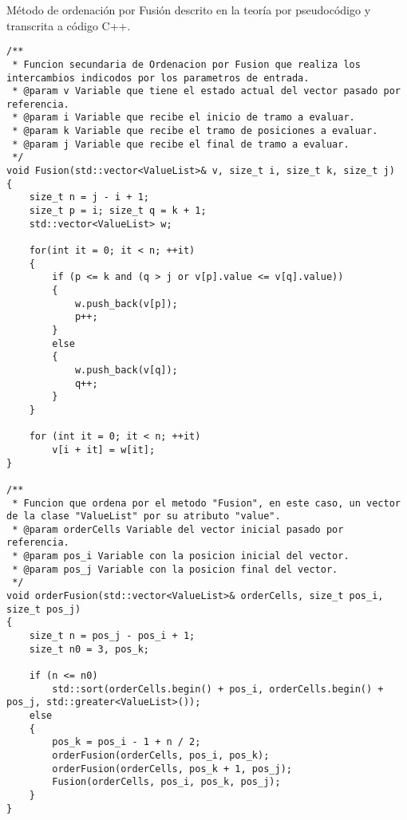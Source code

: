 Método de ordenación por Fusión descrito en la teoría por pseudocódigo y transcrita a código C++.

\begin{lstlisting}
/**
 * Funcion secundaria de Ordenacion por Fusion que realiza los intercambios indicodos por los parametros de entrada.
 * @param v Variable que tiene el estado actual del vector pasado por referencia.
 * @param i Variable que recibe el inicio de tramo a evaluar.
 * @param k Variable que recibe el tramo de posiciones a evaluar.
 * @param j Variable que recibe el final de tramo a evaluar.
 */
void Fusion(std::vector<ValueList>& v, size_t i, size_t k, size_t j)
{
	size_t n = j - i + 1;
	size_t p = i; size_t q = k + 1;
	std::vector<ValueList> w;

	for(int it = 0; it < n; ++it)
	{
		if (p <= k and (q > j or v[p].value <= v[q].value))
		{
			w.push_back(v[p]);
			p++;
		}
		else
		{
			w.push_back(v[q]);
			q++;
		}
	}

	for (int it = 0; it < n; ++it)
		v[i + it] = w[it];
}

/**
 * Funcion que ordena por el metodo "Fusion", en este caso, un vector de la clase "ValueList" por su atributo "value".
 * @param orderCells Variable del vector inicial pasado por referencia.
 * @param pos_i Variable con la posicion inicial del vector.
 * @param pos_j Variable con la posicion final del vector.
 */
void orderFusion(std::vector<ValueList>& orderCells, size_t pos_i, size_t pos_j)
{
	size_t n = pos_j - pos_i + 1;
	size_t n0 = 3, pos_k;

	if (n <= n0)
		std::sort(orderCells.begin() + pos_i, orderCells.begin() + pos_j, std::greater<ValueList>());
	else
	{
		pos_k = pos_i - 1 + n / 2;
		orderFusion(orderCells, pos_i, pos_k);
		orderFusion(orderCells, pos_k + 1, pos_j);
		Fusion(orderCells, pos_i, pos_k, pos_j);
	}
}
\end{lstlisting}